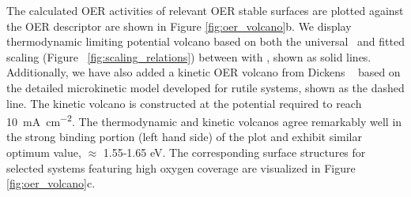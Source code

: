 %
The calculated OER activities of relevant OER stable surfaces are
plotted against the \DGOmOH OER descriptor are shown in Figure \ref{fig:oer_volcano}b.
%
We display thermodynamic limiting potential volcano based on both the universal~\cite{Man2011} and fitted scaling (Figure ~\ref{fig:scaling_relations}) between \DGOOH with \DGOH, shown as solid lines.
%
Additionally, we have also added a kinetic OER volcano from Dickens ~\cite{Dickens2019} based on the detailed microkinetic model developed for rutile systems, shown as the dashed line.
%
The kinetic volcano is constructed at the potential required to reach \SI[mode=text]{10}{\mA\per\cm\squared}.
%
The thermodynamic and kinetic volcanos agree remarkably well in the strong binding portion (left hand side) of the plot and exhibit similar optimum value, \DGOmOH $\approx$ 1.55-1.65 eV.
%
The corresponding surface structures for selected systems featuring high oxygen coverage are visualized in Figure \ref{fig:oer_volcano}c.




